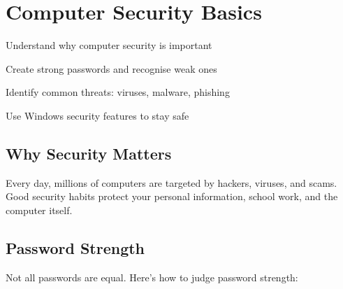 
\chapter{Computer Security Basics}
\label{ch:security}

\begin{objectives}
  \item Understand why computer security is important
  \item Create strong passwords and recognise weak ones
  \item Identify common threats: viruses, malware, phishing
  \item Use Windows security features to stay safe
\end{objectives}


\section{Why Security Matters}
\label{sec:why-security}

Every day, millions of computers are targeted by hackers, viruses, and scams. Good security habits protect your personal information, school work, and the computer itself.

\section{Password Strength}
\label{sec:passwords}

Not all passwords are equal. Here's how to judge password strength:

